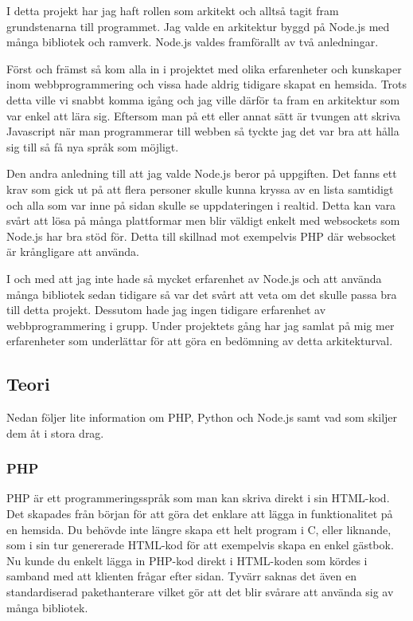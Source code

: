 I detta projekt har jag haft rollen som arkitekt och alltså tagit fram grundstenarna till programmet. Jag valde en arkitektur byggd på Node.js med många bibliotek och ramverk. Node.js valdes framförallt av två anledningar. 

Först och främst så kom alla in i projektet med olika erfarenheter och kunskaper inom webbprogrammering och vissa hade aldrig tidigare skapat en hemsida. Trots detta ville vi snabbt komma igång och jag ville därför ta fram en arkitektur som var enkel att lära sig. Eftersom man på ett eller annat sätt är tvungen att skriva Javascript när man programmerar till webben så tyckte jag det var bra att hålla sig till så få nya språk som möjligt.

Den andra anledning till att jag valde Node.js beror på uppgiften. Det fanns ett krav som gick ut på att flera personer skulle kunna kryssa av en lista samtidigt och alla som var inne på sidan skulle se uppdateringen i realtid. Detta kan vara svårt att lösa på många plattformar men blir väldigt enkelt med websockets som Node.js har bra stöd för. Detta till skillnad mot exempelvis PHP där websocket är krångligare att använda.

I och med att jag inte hade så mycket erfarenhet av Node.js och att använda många bibliotek sedan tidigare så var det svårt att veta om det skulle passa bra till detta projekt. Dessutom hade jag ingen tidigare erfarenhet av webbprogrammering i grupp. Under projektets gång har jag samlat på mig mer erfarenheter som underlättar för att göra en bedömning av detta arkitekturval.

\subsection{Teori}

Nedan följer lite information om PHP, Python och Node.js samt vad som skiljer dem åt i stora drag.

\subsubsection{PHP}

PHP är ett programmeringsspråk som man kan skriva direkt i sin HTML-kod. Det skapades från början för att göra det enklare att lägga in funktionalitet på en hemsida. Du behövde inte längre skapa ett helt program i C, eller liknande, som i sin tur genererade HTML-kod för att exempelvis skapa en enkel gästbok\cite{php_history}. Nu kunde du enkelt lägga in PHP-kod direkt i HTML-koden som kördes i samband med att klienten frågar efter sidan. Tyvärr saknas det även en standardiserad pakethanterare vilket gör att det blir svårare att använda sig av många bibliotek. 

